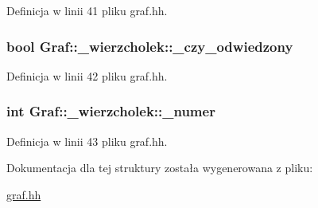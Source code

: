 \-Definicja w linii 41 pliku graf.\-hh.

\hypertarget{struct_graf_1_1__wierzcholek_a818c370b6e8a476f6fb9f89ccac01e2f}{
\subsubsection[{\-\_\-czy\-\_\-odwiedzony}]{\setlength{\rightskip}{0pt plus 5cm}bool {\bf \-Graf\-::\-\_\-wierzcholek\-::\-\_\-czy\-\_\-odwiedzony}}}\label{struct_graf_1_1__wierzcholek_a818c370b6e8a476f6fb9f89ccac01e2f}


\-Definicja w linii 42 pliku graf.\-hh.

\hypertarget{struct_graf_1_1__wierzcholek_a966ecd51ba3e337c8b67587cffab7f9a}{
\subsubsection[{\-\_\-numer}]{\setlength{\rightskip}{0pt plus 5cm}int {\bf \-Graf\-::\-\_\-wierzcholek\-::\-\_\-numer}}}\label{struct_graf_1_1__wierzcholek_a966ecd51ba3e337c8b67587cffab7f9a}


\-Definicja w linii 43 pliku graf.\-hh.



\-Dokumentacja dla tej struktury została wygenerowana z pliku\-:\begin{DoxyCompactItemize}
\item 
\hyperlink{graf_8hh}{graf.\-hh}\end{DoxyCompactItemize}
